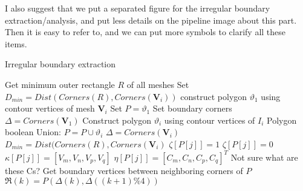 \documentclass[10pt,journal,compsoc]{IEEEtran}
\newcommand{\zfl}[1]{{\color{red}#1}}
\begin{document}
\zfl{I also suggest that we put a separated figure for the irregular boundary extraction/analysis, and put less details on the pipeline image about this part. Then it is easy to refer to, and we can put more symbols to clarify all these items.}

\begin{algorithm}
 \label{alg:irregular_boundary}
     \caption{Irregular boundary extraction}
        Get minimum outer rectangle $R$ of all meshes\;
        Set $D_{min} = Dist(Corners(R), Corners(\mathbf{V}_i))$\;
        construct polygon $\vartheta_1$ using contour vertices of mesh $\mathbf{V}_i$\;
        Set $P=\vartheta_1$\;
        Set boundary corners $\Delta= Corners(\mathbf{V}_1)$\;
        {
            Construct polygon $\vartheta_i$ using contour vertices of $I_i$\;
            Polygon boolean Union: $P=P\cup\vartheta_i$\;
            {
                    $\Delta = Corners(\mathbf{V}_i)$\;
                    $D_{min}=Dist(Corners(R), Corners(\mathbf{V}_i)$\;
            }
        }
        {
             {
                 $\zeta[P[j]]=1$\;
             }
             {
                 $\zeta[P[j]]=0$\;
                 $\kappa[P[j]]=[V_m,V_n,V_p,V_q]$\;
                 $\eta[P[j]]=[C_m,C_n,C_p,C_q]^T$\;
                 \zfl{Not sure what are these Cs?}
             }
        }
       Get boundary vertices between neighboring corners of $P$\;
         {
                 $\Re(k)=P(\Delta(k),\Delta((k+1)\%4))$\;
         }
\end{algorithm}
\end{document}
